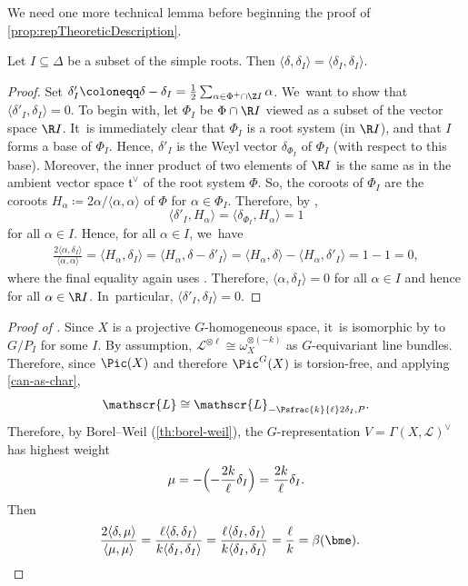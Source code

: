 We need one more technical lemma before beginning the proof of \cref{prop:repTheoreticDescription}.

\begin{lem}
Let $I\subseteq \Delta$ be a subset of the simple roots. Then $\langle\delta,\delta_I\rangle = \langle\delta_I, \delta_I\rangle$.
\end{lem}

\begin{proof}
Set $\delta_I' \coloneqq \delta - \delta_I = \frac{1}{2}\sum_{\alpha\in \Phi^+\cap \Z I} \alpha$. We~want to show that $\langle\delta'_I, \delta_I\rangle=0$. To begin with, let $\Phi_I$ be $\Phi\cap \R I$ viewed as a subset of the vector space $\R I$. It~is immediately clear that $\Phi_I$ is a root system (in $\R I$), and that $I$ forms a base of $\Phi_I$. Hence, $\delta'_I$ is the Weyl vector $\delta_{\Phi_I}$ of $\Phi_I$ (with respect to this base). Moreover, the inner product of two elements of $\R I$ is the same as in the ambient vector space $\mathfrak{t}^\vee$ of the root system $\Phi$. So, the coroots of $\Phi_I$ are the coroots $H_\alpha\coloneqq 2\alpha/\langle\alpha,\alpha\rangle$ of $\Phi$ for $\alpha\in \Phi_I$. Therefore, by \cite[Prop.\,8.38]{Hal15},
\[
\langle\delta'_I, H_\alpha\rangle = \langle\delta_{\Phi_I}, H_\alpha\rangle = 1
\]
for all $\alpha\in I$. Hence, for all $\alpha\in I$, we~have
\begin{align*}
\frac{2\langle \alpha, \delta_I\rangle}{\langle\alpha,\alpha\rangle}
= \langle H_\alpha, \delta_I\rangle
= \langle H_\alpha, \delta - \delta'_I\rangle
= \langle H_\alpha, \delta\rangle - \langle H_\alpha, \delta'_I\rangle
= 1-1 = 0,
\end{align*}
where the final equality again uses \cite[Prop.\,8.38]{Hal15}. Therefore, $\langle\alpha, \delta_I\rangle=0$ for all $\alpha\in I$ and hence for all $\alpha\in \R I$. In~particular, $\langle \delta'_I, \delta_I\rangle=0$.
\end{proof}

\begin{proof}[Proof of ]
Since $X$ is a projective $G$-homogeneous space, it~is isomorphic by  to $G/P_I$ for some $I$. By assumption, $\mathscr{L}^{\otimes \ell}\cong \omega_X^{\otimes (-k)}$ as $G$-equivariant line bundles. Therefore, since $\Pic(X)$ and therefore $\Pic^G(X)$ is torsion-free, and applying \cref{can-as-char},
\begin{equation*}
\mathscr{L} \cong \mathscr{L}_{-\Psfrac{k}{\ell}2\delta_I, P}.
\end{equation*}
Therefore, by Borel--Weil (\cref{th:borel-weil}), the $G$-representation $V=\Gamma(X, \mathscr{L})^\vee$ has highest weight
\[
\mu=-\Bigl(-\frac{2k}{\ell}\delta_I\Bigr)=\frac{2k}{\ell}\delta_I.
\]
Then
\begin{align*}
\frac{2\langle\delta, \mu\rangle}{\langle\mu,\mu\rangle}
&= \frac{\ell\langle \delta, \delta_I\rangle}{k\langle\delta_I, \delta_I\rangle}
= \frac{\ell\langle \delta_I, \delta_I\rangle}{k\langle\delta_I, \delta_I\rangle}
= \frac{\ell}{k}
= \beta(\bme). \qedhere
\end{align*}
\end{proof}

